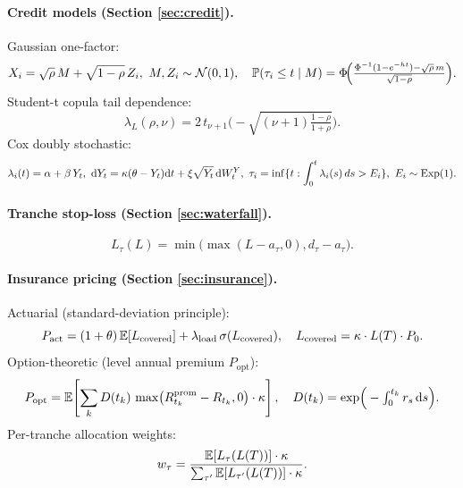 \paragraph{Credit models (Section \ref{sec:credit}).}
Gaussian one-factor:
\begin{equation*}
X_i = \sqrt{\rho}\,M + \sqrt{1 - \rho}\,Z_i,\ M, Z_i \sim \mathcal{N}(0,1),
\quad
\mathbb{P}(\tau_i \le t \mid M) = \Phi\!\Big(\tfrac{\Phi^{-1}(1 - e^{-h t}) - \sqrt{\rho}\, m}{\sqrt{1 - \rho}}\Big).
\end{equation*}
Student-t copula tail dependence:
\begin{equation*}
\lambda_L(\rho, \nu) = 2\, t_{\nu + 1}\!\Big(-\sqrt{(\nu + 1)\tfrac{1 - \rho}{1 + \rho}}\Big).
\end{equation*}
Cox doubly stochastic:
\begin{equation*}
\lambda_i(t) = \alpha + \beta\,Y_t,\
\mathrm{d}Y_t = \kappa(\theta - Y_t)\mathrm{d}t + \xi\sqrt{Y_t}\,\mathrm{d}W^Y_t,\
\tau_i = \inf\{t : \int_0^t \lambda_i(s)\,ds > E_i\},\ E_i \sim \mathrm{Exp}(1).
\end{equation*}

\paragraph{Tranche stop-loss (Section \ref{sec:waterfall}).}
\begin{equation*}
L_\tau(L) = \min\bigl(\max(L - a_\tau, 0), d_\tau - a_\tau\bigr).
\end{equation*}

\paragraph{Insurance pricing (Section \ref{sec:insurance}).}
Actuarial (standard-deviation principle):
\begin{equation*}
P_{\text{act}} = (1 + \theta)\,\mathbb{E}[L_{\text{covered}}] + \lambda_{\text{load}}\,\sigma(L_{\text{covered}}),
\quad L_{\text{covered}} = \kappa \cdot L(T) \cdot P_0.
\end{equation*}
Option-theoretic (level annual premium $P_{\text{opt}}$):
\begin{equation*}
P_{\text{opt}} = \mathbb{E}\!\left[\sum_k D(t_k)\,\max\bigl(R^{\text{prom}}_{t_k} - R_{t_k}, 0\bigr) \cdot \kappa\right],
\quad D(t_k) = \exp\!\Big(-\textstyle\int_0^{t_k} r_s\,\mathrm{d}s\Big).
\end{equation*}
Per-tranche allocation weights:
\begin{equation*}
w_\tau = \frac{\mathbb{E}[L_\tau(L(T))] \cdot \kappa}{\sum_{\tau'} \mathbb{E}[L_{\tau'}(L(T))] \cdot \kappa}.
\end{equation*}

